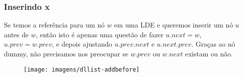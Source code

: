 \documentclass{beamer}
\begin{document}
\begin{frame}
\frametitle{Inserindo x}
Se temos a referência para um nó $ \ensuremath{\ensuremath{\mathit{w}}}$ em uma LDE e queremos inserir um nó $ \ensuremath{\ensuremath{\mathit{u}}}$ antes de $ \ensuremath{\ensuremath{\mathit{w}}}$, então isto é apenas uma questão de fazer $ \ensuremath{\ensuremath{\ensuremath{\mathit{u}}.\ensuremath{\mathit{next}}}}=\ensuremath{\ensuremath{\ensuremath{\mathit{w}}}}$, $ \ensuremath{\ensuremath{\ensuremath{\mathit{u}}.\ensuremath{\mathit{prev}}}}=\ensuremath{\ensuremath{\ensuremath{\mathit{w}}.\ensuremath{\mathit{prev}}}}$, e depois ajustando $ \ensuremath{\ensuremath{\mathit{u}}.\ensuremath{\mathit{prev}}.\ensuremath{\mathit{next}}}$ e $ \ensuremath{\ensuremath{\mathit{u}}.\ensuremath{\mathit{next}}.\ensuremath{\mathit{prev}}}$. Graças ao nó dummy, não precisamos nos preocupar se $ \ensuremath{\ensuremath{\mathit{w}}.\ensuremath{\mathit{prev}}}$ ou $ \ensuremath{\ensuremath{\mathit{w}}.\ensuremath{\mathit{next}}}$ existam ou não. 
\begin{figure}
   \begin{center}
      \texttt{[image: imagens/dllist-addbefore]}
   \end{center}
\end{figure}
\end{frame}
\end{document}
